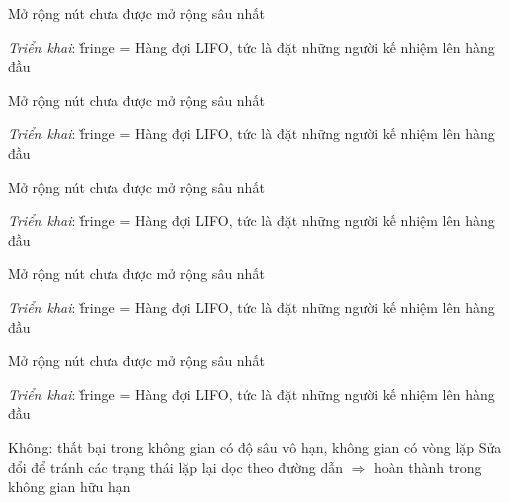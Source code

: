 \documentclass{article}
\begin{document}
\begin{huge}
Mở rộng nút chưa được mở rộng sâu nhất

\emph{Triển khai}:\nl
\v{fringe} = Hàng đợi LIFO, tức là đặt những người kế nhiệm lên hàng đầu

\textwidth
{}



Mở rộng nút chưa được mở rộng sâu nhất

\emph{Triển khai}:\nl
\v{fringe} = Hàng đợi LIFO, tức là đặt những người kế nhiệm lên hàng đầu

\textwidth
{}



Mở rộng nút chưa được mở rộng sâu nhất

\emph{Triển khai}:\nl
\v{fringe} = Hàng đợi LIFO, tức là đặt những người kế nhiệm lên hàng đầu

\textwidth
{}



Mở rộng nút chưa được mở rộng sâu nhất

\emph{Triển khai}:\nl
\v{fringe} = Hàng đợi LIFO, tức là đặt những người kế nhiệm lên hàng đầu

\textwidth
{}



Mở rộng nút chưa được mở rộng sâu nhất

\emph{Triển khai}:\nl
\v{fringe} = Hàng đợi LIFO, tức là đặt những người kế nhiệm lên hàng đầu

\textwidth
{}





 Không: thất bại trong không gian có độ sâu vô hạn, không gian có vòng lặp\nl
Sửa đổi để tránh các trạng thái lặp lại dọc theo đường dẫn \nnl
$\Rightarrow$ hoàn thành trong không gian hữu hạn


\end{huge}
\end{document}
